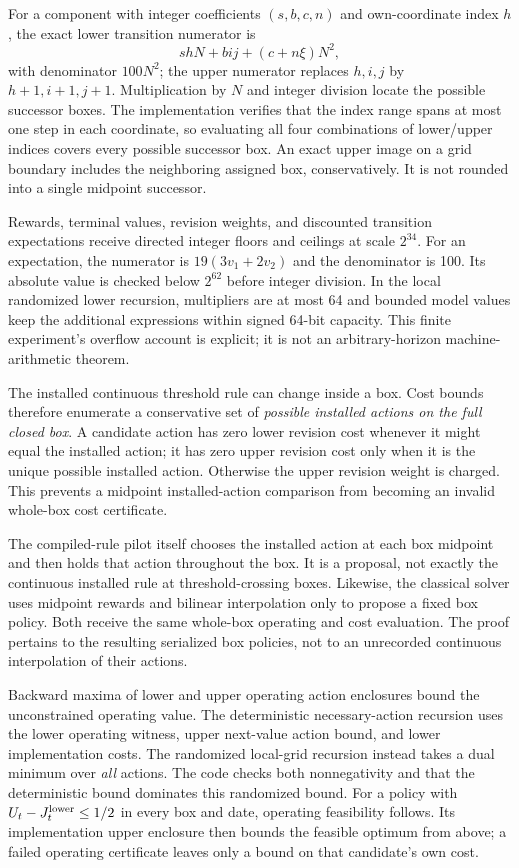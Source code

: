 For a component with integer coefficients $(s,b,c,n)$ and own-coordinate index $h$, the exact lower transition numerator is
\[
 s h N+b i j+(c+n\xi)N^2,
\]
with denominator $100N^2$; the upper numerator replaces $h,i,j$ by $h+1,i+1,j+1$. Multiplication by $N$ and integer division locate the possible successor boxes. The implementation verifies that the index range spans at most one step in each coordinate, so evaluating all four combinations of lower/upper indices covers every possible successor box. An exact upper image on a grid boundary includes the neighboring assigned box, conservatively. It is not rounded into a single midpoint successor.

Rewards, terminal values, revision weights, and discounted transition expectations receive directed integer floors and ceilings at scale $2^{34}$. For an expectation, the numerator is $19(3v_1+2v_2)$ and the denominator is 100. Its absolute value is checked below $2^{62}$ before integer division. In the local randomized lower recursion, multipliers are at most 64 and bounded model values keep the additional expressions within signed 64-bit capacity. This finite experiment's overflow account is explicit; it is not an arbitrary-horizon machine-arithmetic theorem.

The installed continuous threshold rule can change inside a box. Cost bounds therefore enumerate a conservative set of \emph{possible installed actions on the full closed box}. A candidate action has zero lower revision cost whenever it might equal the installed action; it has zero upper revision cost only when it is the unique possible installed action. Otherwise the upper revision weight is charged. This prevents a midpoint installed-action comparison from becoming an invalid whole-box cost certificate.

The compiled-rule pilot itself chooses the installed action at each box midpoint and then holds that action throughout the box. It is a proposal, not exactly the continuous installed rule at threshold-crossing boxes. Likewise, the classical solver uses midpoint rewards and bilinear interpolation only to propose a fixed box policy. Both receive the same whole-box operating and cost evaluation. The proof pertains to the resulting serialized box policies, not to an unrecorded continuous interpolation of their actions.

Backward maxima of lower and upper operating action enclosures bound the unconstrained operating value. The deterministic necessary-action recursion uses the lower operating witness, upper next-value action bound, and lower implementation costs. The randomized local-grid recursion instead takes a dual minimum over \emph{all} actions. The code checks both nonnegativity and that the deterministic bound dominates this randomized bound. For a policy with $U_t-J_t^{\rm lower}\leq1/2$ in every box and date, operating feasibility follows. Its implementation upper enclosure then bounds the feasible optimum from above; a failed operating certificate leaves only a bound on that candidate's own cost.

